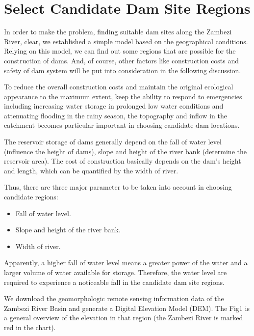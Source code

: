 \documentclass{mcmthesis}
\begin{document}
\section{Select Candidate Dam Site Regions}
In order to make the problem, finding suitable dam sites along the Zambezi River, clear, we established a simple model based on the geographical conditions. Relying on this model, we can find out some regions that are possible for the construction of dams. And, of course, other factors like construction costs and safety of dam system will be put into consideration in the following discussion.

To reduce the overall construction costs and maintain the original ecological appearance to the maximum extent, keep the ability to respond to emergencies including increasing water storage in prolonged low water conditions and attenuating flooding in the rainy season, the topography and inflow in the catchment becomes particular important in choosing candidate dam locations.  

The reservoir storage of dams generally depend on the fall of water level (influence the height of dams), slope and height of the river bank (determine the reservoir area). The cost of construction basically depends on the dam’s height and length, which can be quantified by the width of river.
  
Thus, there are three major parameter to be taken into account in choosing candidate regions:
\begin{itemize}
\item Fall of water level.
\item Slope and height of the river bank.
\item Width of river.
\end{itemize}

Apparently, a higher fall of water level means a greater power of the water and a larger volume of water available for storage. Therefore, the water level are required to experience a noticeable fall in the candidate dam site regions. 

We download the geomorphologic remote sensing information data of the Zambezi River Basin and generate a Digital Elevation Model (DEM). The Fig1 is a general overview of the elevation in that region (the Zambezi River is marked red in the chart).
\end{document}
